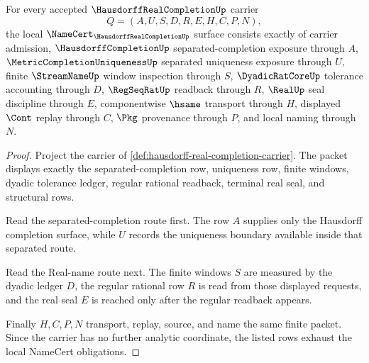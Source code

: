 \begin{theorem}
\label{thm:hausdorff-real-completion-namecert-obligations}
For every accepted $\HausdorffRealCompletionUp$ carrier
$$
Q=(A,U,S,D,R,E,H,C,P,N),
$$
the local $\NameCert_{\HausdorffRealCompletionUp}$ surface consists exactly of carrier admission, $\HausdorffCompletionUp$ separated-completion exposure through $A$, $\MetricCompletionUniquenessUp$ separated uniqueness exposure through $U$, finite $\StreamNameUp$ window inspection through $S$, $\DyadicRatCoreUp$ tolerance accounting through $D$, $\RegSeqRatUp$ readback through $R$, $\RealUp$ seal discipline through $E$, componentwise $\hsame$ transport through $H$, displayed $\Cont$ replay through $C$, $\Pkg$ provenance through $P$, and local naming through $N$.
\end{theorem}
\begin{proof}
Project the carrier of \autoref{def:hausdorff-real-completion-carrier}. The packet displays exactly the separated-completion row, uniqueness row, finite windows, dyadic tolerance ledger, regular rational readback, terminal real seal, and structural rows.

Read the separated-completion route first. The row $A$ supplies only the Hausdorff completion surface, while $U$ records the uniqueness boundary available inside that separated route.

Read the Real-name route next. The finite windows $S$ are measured by the dyadic ledger $D$, the regular rational row $R$ is read from those displayed requests, and the real seal $E$ is reached only after the regular readback appears.

Finally $H,C,P,N$ transport, replay, source, and name the same finite packet. Since the carrier has no further analytic coordinate, the listed rows exhaust the local NameCert obligations.
\end{proof}

